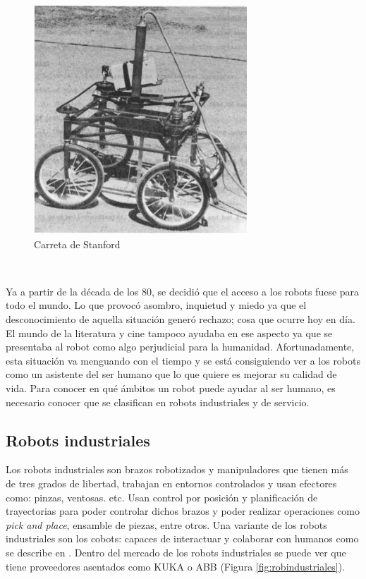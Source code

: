 \begin{figure} [h!]
	\begin{center}
		\includegraphics[width=8cm]{figs/stanford.png}
	\end{center}
	\caption{Carreta de Stanford}
	\label{fig:stanford}
\end{figure}\


Ya a partir de la década de los 80, se decidió que el acceso a los robots fuese para todo el mundo. Lo que provocó asombro, inquietud y miedo ya que el desconocimiento de aquella situación generó rechazo; cosa que ocurre hoy en día. El mundo de la literatura y cine tampoco ayudaba en ese aspecto ya que se presentaba al robot como algo perjudicial para la humanidad. Afortunadamente, esta situación va menguando con el tiempo y se está consiguiendo ver a los robots como un asistente del ser humano que lo que quiere es mejorar su calidad de vida. Para conocer en qué ámbitos un robot puede ayudar al ser humano, es necesario conocer que se clasifican en robots industriales y de servicio. \\


\subsection{Robots industriales}

Los robots industriales son brazos robotizados y manipuladores que tienen más de tres grados de libertad, trabajan en entornos controlados y usan efectores como: pinzas, ventosas. etc. Usan control por posición y planificación de trayectorias para poder controlar dichos brazos y poder realizar operaciones como \textit{pick and place}, ensamble de piezas, entre otros. Una variante de los robots industriales son los cobots: capaces de interactuar y colaborar con humanos como se describe en  \cite{ELZAATARI2019162}. Dentro del mercado de los robots industriales se puede ver que tiene proveedores asentados como \acs{KUKA} o \acs{ABB} (Figura \ref{fig:robindustriales}).



